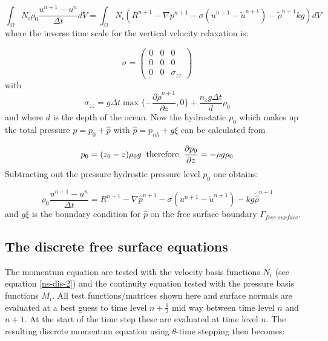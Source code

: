 \begin{equation}
\int_\Omega N_i \rho_0 \frac{u^{n+1}- u^n}{\Delta t} d V= 
\int_\Omega N_i (R^{n+1} - \nabla p^{n+1} 
- \sigma (u^{n+1}-\tilde
u^{n+1}) 
- {\tilde \rho}^{n+1} k g ) dV
\label{ns-dis-2}
\end{equation}
where the inverse time scale for the vertical velocity 
relaxation is:

\begin{equation}
\sigma=  
  \begin{pmatrix}
    0   & 0 & 0 \\
    0   & 0 & 0 \\
    0 & 0 & \sigma_{zz}
  \end{pmatrix}
\label{sigma_matrix}
\end{equation}
with
\begin{equation}
\sigma_{zz}= g \Delta t \max\{-\frac{\partial {\tilde \rho}^{n+1}}{\partial z},
0\} 
+ \frac{n_z g \Delta t}{d} \rho_0 
\label{sigma_z}
\end{equation}
and where $d$ is the depth of the ocean. 
Now the hydrostatic $p_0$ which makes up the total 
pressure $p=p_0+\hat p $ with $\hat p = p_{nh} + g\xi$
can be calculated from 

\begin{equation}
p_0=(z_0-z)\rho_0 g \;\;{\rm therefore}\;\; 
\frac{\partial p_0}{\partial z}= -\rho g \rho_0
\label{p_h}
\end{equation}
Subtracting out the pressure hydrostic pressure level $p_0$ one obtains:

\begin{equation}
\rho_0 \frac{u^{n+1}- u^n}{\Delta t} = 
R^{n+1} - \nabla \hat p^{n+1} 
- \sigma (u^{n+1}-\tilde u^{n+1}) - kg{\tilde{\hat\rho}}^{n+1}
\label{ns-dis-3}
\end{equation}
and $g \xi$ is the boundary condition for $\hat p$ on the free 
surface boundary $\Gamma_{free\; surface}$. 





\subsection{The discrete free surface equations}
\noindent The momentum equation are tested with the velocity 
basis functions $N_i$ (see equation \ref{ns-dis-2}) and the continuity equation tested 
with the pressure basis functions $M_i$. All test functions/matrices 
shown here and surface normals are evaluated at a best guess to 
time level $n+\frac{1}{2}$ mid way 
between time level $n$ and $n+1$. At the start of the time 
step these are evaluated at time level $n$. 
The resulting discrete momentum equation using $\theta$-time stepping then becomes: 

